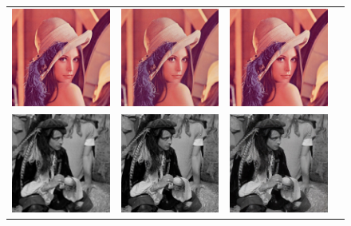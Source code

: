 \documentclass[10pt,twocolumn,letterpaper]{article}
\begin{document}
\begin{figure}[h!]
\begin{tabular}{cccc}
\includegraphics[width=1.5in]{images/used/appendix/jpg/Set14/lenna_SRResNet-MSE} &
\includegraphics[width=1.5in]{images/used/appendix/jpg/Set14/lenna_SRGAN-VGG54} &
\includegraphics[width=1.5in]{images/used/appendix/jpg/Set14/lenna_HR} \\
\includegraphics[width=1.5in]{images/used/appendix/jpg/Set14/man_bicubic}&
\includegraphics[width=1.5in]{images/used/appendix/jpg/Set14/man_SRResNet-MSE} &
\includegraphics[width=1.5in]{images/used/appendix/jpg/Set14/man_SRGAN-VGG54} &

\end{tabular}
\end{figure}
\end{document}
